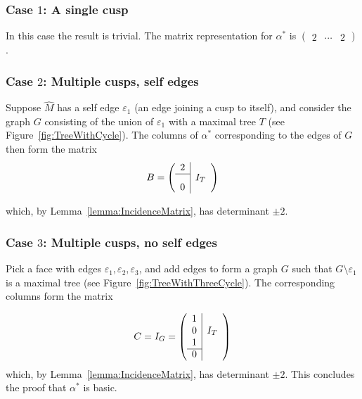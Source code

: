 \documentclass[12pt]{amsart}
\theoremstyle{definition}
\numberwithin{equation}{section}
\begin{document}
\subsubsection{Case $1$: A single cusp}
In this case the result is trivial. The matrix representation for $\alpha^*$ is $\begin{pmatrix}2&\cdots&2\end{pmatrix}$.

\subsubsection{Case $2$: Multiple cusps, self edges}
Suppose $\widehat M$ has a self edge $\varepsilon_1$ (an edge joining a cusp to itself), and consider the graph $G$ consisting of the union of $\varepsilon_1$ with a maximal tree $T$ (see Figure~\ref{fig:TreeWithCycle}). The columns of $\alpha^*$ corresponding to the edges of $G$ then form the matrix 
\begin{equation}
B=\left(\begin{array}{c|c}
2& \\\cline{1-1}
 0 &\raisebox{10pt}{{$I_T$}}
\end{array}\right)
\end{equation}

which, by Lemma~\ref{lemma:IncidenceMatrix}, has determinant $\pm 2$.
\subsubsection{Case $3$: Multiple cusps, no self edges}
Pick a face with edges $\varepsilon_1,\varepsilon_2,\varepsilon_3$, and add edges to form a graph $G$ such that $G\setminus \varepsilon_1$ is a maximal tree (see Figure~\ref{fig:TreeWithThreeCycle}). The corresponding columns form the matrix

\begin{equation}
C=I_G=\left(\begin{array}{c|c}
1&\\ 
0&I_T\\
1&\\\cline{1-1} 
 0&
\end{array}\right)
\end{equation}
which, by Lemma~\ref{lemma:IncidenceMatrix}, has determinant $\pm 2$.
This concludes the proof that $\alpha^*$ is basic.
\end{document}
